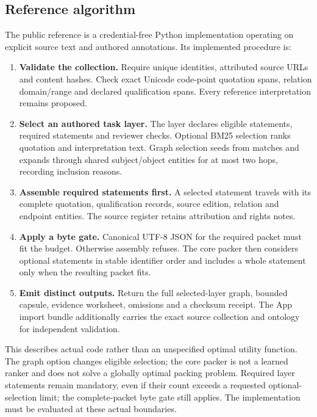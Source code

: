 \documentclass[
  11pt,
]{article}
\providecommand{\tightlist}{%
  \setlength{\itemsep}{0pt}\setlength{\parskip}{0pt}}
\begin{document}
\subsection{Reference algorithm}\label{reference-algorithm}

The public reference is a credential-free Python implementation
operating on explicit source text and authored annotations. Its
implemented procedure is:

\begin{enumerate}
\def\labelenumi{\arabic{enumi}.}
\tightlist
\item
  \textbf{Validate the collection.} Require unique identities,
  attributed source URLs and content hashes. Check exact Unicode
  code-point quotation spans, relation domain/range and declared
  qualification spans. Every reference interpretation remains proposed.
\item
  \textbf{Select an authored task layer.} The layer declares eligible
  statements, required statements and reviewer checks. Optional BM25
  selection ranks quotation and interpretation text. Graph selection
  seeds from matches and expands through shared subject/object entities
  for at most two hops, recording inclusion reasons.
\item
  \textbf{Assemble required statements first.} A selected statement
  travels with its complete quotation, qualification records, source
  edition, relation and endpoint entities. The source register retains
  attribution and rights notes.
\item
  \textbf{Apply a byte gate.} Canonical UTF-8 JSON for the required
  packet must fit the budget. Otherwise assembly refuses. The core
  packer then considers optional statements in stable identifier order
  and includes a whole statement only when the resulting packet fits.
\item
  \textbf{Emit distinct outputs.} Return the full selected-layer graph,
  bounded capsule, evidence worksheet, omissions and a checksum receipt.
  The App import bundle additionally carries the exact source collection
  and ontology for independent validation.
\end{enumerate}

This describes actual code rather than an unspecified optimal utility
function. The graph option changes eligible selection; the core packer
is not a learned ranker and does not solve a globally optimal packing
problem. Required layer statements remain mandatory, even if their count
exceeds a requested optional-selection limit; the complete-packet byte
gate still applies. The implementation must be evaluated at these actual
boundaries.
\end{document}
